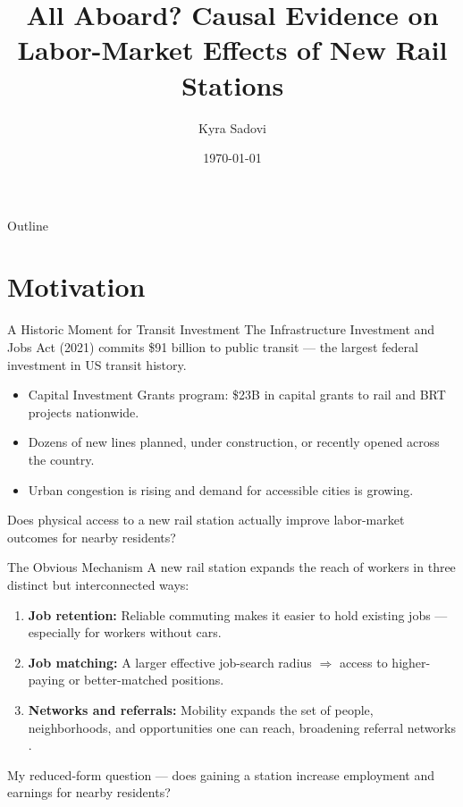 \documentclass{beamer}
\title[New Rail Stations \& Labor Markets]{All Aboard? Causal Evidence on Labor-Market Effects of New Rail Stations}
\author{Kyra Sadovi}
\institute{University of Chicago Harris School of Public Policy \\
\href{mailto:ksadovi@uchicago.edu}{ksadovi@uchicago.edu}}
\date{\today}
\begin{document}
\begin{frame}[plain]
  \titlepage
\end{frame}

\begin{frame}{Outline}
  \tableofcontents
\end{frame}

\section{Motivation}

\begin{frame}{A Historic Moment for Transit Investment}
\small
The Infrastructure Investment and Jobs Act (2021) commits \$91 billion to public
transit --- the largest federal investment in US transit history.

\bigskip
\begin{itemize}
  \item Capital Investment Grants program: \$23B in capital grants to rail and BRT projects nationwide.
  \item Dozens of new lines planned, under construction, or recently opened across the country.
  \item Urban congestion is rising and demand for accessible cities is growing.
\end{itemize}

\bigskip
Does physical access to a new rail station
actually improve labor-market outcomes for nearby residents?
\end{frame}

\begin{frame}{The Obvious Mechanism}
\small
A new rail station expands the reach of workers in three distinct but interconnected ways:

\bigskip
\begin{enumerate}
  \item \textbf{Job retention:} Reliable commuting makes it easier to hold existing jobs ---
        especially for workers without cars.
  \item \textbf{Job matching:} A larger effective job-search radius
        $\Rightarrow$ access to higher-paying or better-matched positions.
  \item \textbf{Networks and referrals:} Mobility expands the set of people, neighborhoods,
        and opportunities one can reach, broadening referral networks
        \parencite{patacchini_referral_fx}.
\end{enumerate}

\bigskip
My reduced-form question --- does gaining a station increase
employment and earnings for nearby residents?
\end{frame}
\end{document}
